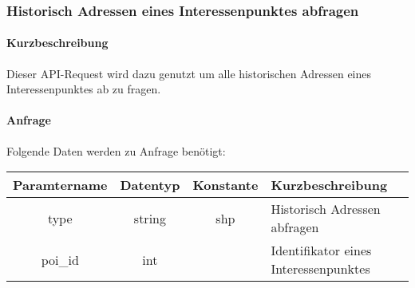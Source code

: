 \subsubsection{Historisch Adressen eines Interessenpunktes abfragen}
\paragraph{Kurzbeschreibung}Dieser API-Request wird dazu genutzt um alle historischen Adressen eines Interessenpunktes ab zu fragen.
\paragraph{Anfrage}Folgende Daten werden zu Anfrage benötigt:
\begin{table}[H]
	\begin{tabular}{|c|c|c|p{6.5cm}|}
		\hline
		\textbf{Paramtername} & \textbf{Datentyp} & \textbf{Konstante} & \textbf{Kurzbeschreibung}                                                                                               \\ \hline
		type                & string            & shp                & Historisch Adressen abfragen \\ \hline
		poi\_id             & int               &                    & Identifikator eines Interessenpunktes \\ \hline
	\end{tabular}
\end{table}
